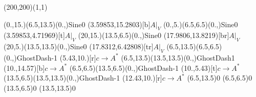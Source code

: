 \unitlength=1bp%

\begin{feynartspicture}(200,200)(1,1)

\FADiagram{}
\FAProp(0.,15.)(6.5,13.5)(0.,){Sine}{0}
\FALabel(3.59853,15.2803)[b]{$A|_V$}
\FAProp(0.,5.)(6.5,6.5)(0.,){Sine}{0}
\FALabel(3.59853,4.71969)[t]{$A|_V$}
\FAProp(20,15.)(13.5,6.5)(0.,){Sine}{0}
\FALabel(17.9806,13.8219)[br]{$A|_V$}
\FAProp(20,5.)(13.5,13.5)(0.,){Sine}{0}
\FALabel(17.8312,6.42808)[tr]{$A|_V$}
\FAProp(6.5,13.5)(6.5,6.5)(0.,){GhostDash}{-1}
\FALabel(5.43,10.)[r]{$c\to A^*$}
\FAProp(6.5,13.5)(13.5,13.5)(0.,){GhostDash}{1}
\FALabel(10.,14.57)[b]{$c\to A^*$}
\FAProp(6.5,6.5)(13.5,6.5)(0.,){GhostDash}{-1}
\FALabel(10.,5.43)[t]{$c\to A^*$}
\FAProp(13.5,6.5)(13.5,13.5)(0.,){GhostDash}{-1}
\FALabel(12.43,10.)[r]{$c\to A^*$}
\FAVert(6.5,13.5){0}
\FAVert(6.5,6.5){0}
\FAVert(13.5,6.5){0}
\FAVert(13.5,13.5){0}
\end{feynartspicture}

